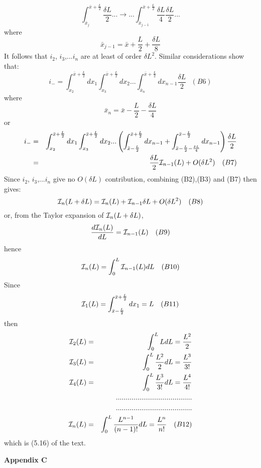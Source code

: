 {\[\int_{\bar{x}_j}^{\bar{x} +\frac{L}{2}} \frac{\delta L}{2}
 ...   \rightarrow... \int_{\bar{x}_{j-1}}^{\bar{x} +\frac{L}{2}}
   \frac{\delta L}{4} \frac{\delta L}{2}...\]
      where   
    \[\bar{x}_{j-1} = \bar{x} +\frac{L}{2}+ \frac{\delta L}{8} \]
   It follows that $i_2$, $i_3$,...$i_n$ are at least of order $\delta L^2$.
   Similar considerations show that:
 \[    i_-  =  \int_{x_2}^{\bar{x} +\frac{L}{2}} d x_1 
   \int_{x_3}^{\bar{x} +\frac{L}{2}} d x_2...
 \int_{\bar{x}_n}^{\bar{x} +\frac{L}{2}} d x_{n-1} \frac{\delta L}{2}~~~(B6) \]
  where
  \[\bar{x}_n = \bar{x} -\frac{L}{2}- \frac{\delta L}{4} \]
  or 
   \begin{eqnarray}
    i_- &  =  & \int_{x_2}^{\bar{x} +\frac{L}{2}} d x_1 
   \int_{x_3}^{\bar{x} +\frac{L}{2}} d x_2...\left(
 \int_{\bar{x} -\frac{L}{2}}^{\bar{x} +\frac{L}{2}} d x_{n-1}+ 
    \int_{\bar{x} -\frac{L}{2}- \frac{\delta L}{4}}^{\bar{x} -\frac{L}{2}} d x_{n-1}
    \right) \frac{\delta L}{2} \nonumber \\
   & = &  \frac{\delta L}{2}{\cal I}_{n-1}(L)+ O(\delta L^2) \nonumber  ~~~(B7)
  \end{eqnarray}
   Since  $i_2$, $i_3$,...$i_n$ give no $O(\delta L)$ contribution, combining
 (B2),(B3) and (B7) then gives:
  \[{\cal I}_{n}(L+\delta L) = {\cal I}_{n}(L) + {\cal I}_{n-1}\delta L + O(\delta L^2)~~~(B8)\]
   or, from the Taylor expansion of ${\cal I}_{n}(L+\delta L)$,
   \[ \frac{ d{\cal I}_{n}(L)}{dL} =  {\cal I}_{n-1}(L)~~~(B9)\]
   hence
   \[ {\cal I}_{n}(L) = \int_{0}^{L} {\cal I}_{n-1}(L) dL~~~(B10)\]
    Since
   \[  {\cal I}_{1}(L) = \int_{\bar{x} -\frac{L}{2}}^{\bar{x} +\frac{L}{2}}d x_1 = L~~~(B11) \]
    then 
     \begin{eqnarray}
     {\cal I}_{2}(L) &  = &  \int_{0}^{L} LdL = \frac{L^2}{2} \nonumber \\
     {\cal I}_{3}(L) &  = &  \int_{0}^{L} \frac{L^2}{2} dL = \frac{L^3}{3!} \nonumber \\
      {\cal I}_{4}(L) &  = &  \int_{0}^{L} \frac{L^3}{3!} dL = \frac{L^4}{4!} \nonumber \\
           &   &....................................... \nonumber \\
           &   &....................................... \nonumber \\
    {\cal I}_{n}(L) &  = &  \int_{0}^{L} \frac{L^{n-1}}{(n-1)!} dL = \frac{L^n}{n!}
    \nonumber ~~~(B12)
    \end{eqnarray}
     which is (5.16) of the text.


 \newpage
  {\bf Appendix C}
  
}
